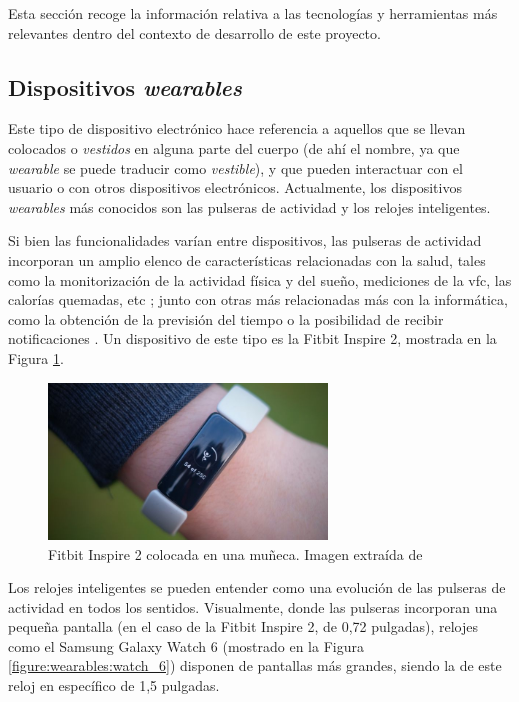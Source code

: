     Esta sección recoge la información relativa a las tecnologías y herramientas más relevantes dentro del contexto de desarrollo de este proyecto.

    \subsection{Dispositivos \textit{wearables}}
        \label{section:contexto:wearables}

        Este tipo de dispositivo electrónico hace referencia a aquellos que se llevan colocados o \textit{vestidos} en alguna parte del cuerpo (de ahí el nombre, ya que \textit{wearable} se puede traducir como \textit{vestible}), y que pueden interactuar con el usuario o con otros dispositivos electrónicos. Actualmente, los dispositivos \textit{wearables} más conocidos son las pulseras de actividad y los relojes inteligentes.

        Si bien las funcionalidades varían entre dispositivos, las pulseras de actividad incorporan un amplio elenco de características relacionadas con la salud, tales como la monitorización de la actividad física y del sueño, mediciones de la \gls{vfc}, las calorías quemadas, etc \cite{luque_ordonez_dispositivos_2016}; junto con otras más relacionadas más con la informática, como la obtención de la previsión del tiempo o la posibilidad de recibir notificaciones \cite{banco_santander_wearables_2022}. Un dispositivo de este tipo es la Fitbit Inspire 2, mostrada en la Figura \ref{figure:wearables:inspire_2}.

        \begin{figure}[h]
            \centering
            \includegraphics[width=0.66\textwidth]{figures/Fitbit inspire 2.jpg}
            \caption[Fitbit Inspire 2 colocada en una muñeca]
            {Fitbit Inspire 2 colocada en una muñeca. Imagen extraída de \cite{delves_fitbit_2022}}
            \label{figure:wearables:inspire_2}
        \end{figure}

        Los relojes inteligentes se pueden entender como una evolución de las pulseras de actividad en todos los sentidos. Visualmente, donde las pulseras incorporan una pequeña pantalla (en el caso de la Fitbit Inspire 2, de 0,72 pulgadas), relojes como el Samsung Galaxy Watch 6 (mostrado en la Figura \ref{figure:wearables:watch_6}) disponen de pantallas más grandes, siendo la de este reloj en específico de 1,5 pulgadas. 


